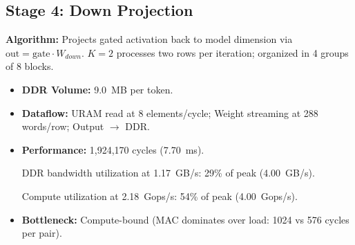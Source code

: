 \documentclass[conference]{IEEEtran}
\begin{document}
\subsection*{Stage 4: Down Projection}
\textbf{Algorithm:} Projects gated activation back to model dimension via $\text{out} = \text{gate} \cdot W_{down}$. $K=2$ processes two rows per iteration; organized in 4 groups of 8 blocks.

\begin{itemize}
    \item \textbf{DDR Volume:} \SI{9.0}{MB} per token.
    \item \textbf{Dataflow:} URAM read at 8 elements/cycle; Weight streaming at 288 words/row; Output $\rightarrow$ DDR.
    \item \textbf{Performance:} 1,924,170 cycles (\SI{7.70}{ms}).
     
     DDR bandwidth utilization at \SI{1.17}{GB/s}: 29\% of peak (\SI{4.00}{GB/s}).
     
     Compute utilization at \SI{2.18}{Gops/s}: 54\% of peak (\SI{4.00}{Gops/s}).
    
    \item \textbf{Bottleneck:} Compute-bound (MAC dominates over load: 1024 vs 576 cycles per pair).
\end{itemize}
\end{document}
